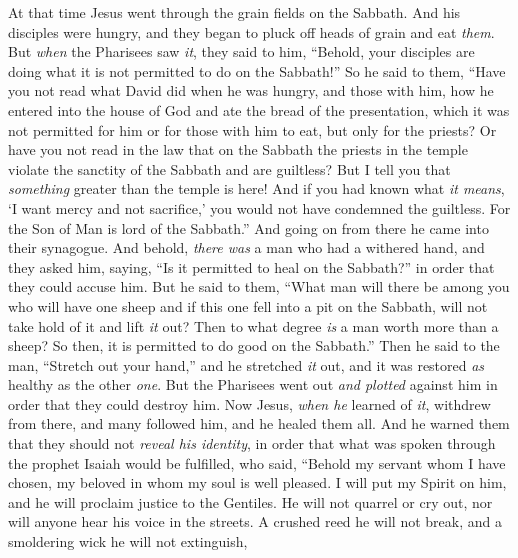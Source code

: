 \begin{biblechapter} %
 At that time Jesus went through the grain fields on the Sabbath. And his disciples were hungry, and they began to pluck off heads of grain and eat \textit{them}.
\verse But \textit{when} the Pharisees saw \textit{it}, they said to him, “Behold, your disciples are doing what it is not permitted to do on the Sabbath!”
\verse So he said to them, “Have you not read what David did when he was hungry, and those with him,
\verse how he entered into the house of God and ate the bread of the presentation, which it was not permitted for him or for those with him to eat, but only for the priests?
\verse Or have you not read in the law that on the Sabbath the priests in the temple violate the sanctity of the Sabbath and are guiltless?
\verse But I tell you that \textit{something} greater than the temple is here!
\verse And if you had known what \textit{it means}, ‘I want mercy and not sacrifice,’ you would not have condemned the guiltless.
\verse For the Son of Man is lord of the Sabbath.”
 And going on from there he came into their synagogue.
\verse And behold, \textit{there was} a man who had a withered hand, and they asked him, saying, “Is it permitted to heal on the Sabbath?” in order that they could accuse him.
\verse But he said to them, “What man will there be among you who will have one sheep and if this one fell into a pit on the Sabbath, will not take hold of it and lift \textit{it} out?
\verse Then to what degree \textit{is} a man worth more than a sheep? So then, it is permitted to do good on the Sabbath.”
\verse Then he said to the man, “Stretch out your hand,” and he stretched \textit{it} out, and it was restored \textit{as} healthy as the other \textit{one}.
\verse But the Pharisees went out \textit{and plotted} against him in order that they could destroy him.
 Now Jesus, \textit{when he} learned of \textit{it}, withdrew from there, and many followed him, and he healed them all.
\verse And he warned them that they should not \textit{reveal his identity},
\verse in order that what was spoken through the prophet Isaiah would be fulfilled, who said,
\verse “Behold my servant whom I have chosen, 
my beloved in whom my soul is well pleased. 
I will put my Spirit on him, 
and he will proclaim justice to the Gentiles.
\verse He will not quarrel or cry out, 
nor will anyone hear his voice in the streets.
\verse A crushed reed he will not break, 
and a smoldering wick he will not extinguish, 

\end{biblechapter}
